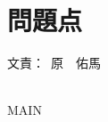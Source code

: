 \documentclass[a4paper]{jarticle}
\newcommand{\resp}[1]{\begin{flushright}文責：~#1\end{flushright}~\\}
\begin{document}
\fi

\section{問題点}
  \resp{原　佑馬}

\expandafter\ifx\csname MAIN \endcsname\relax
  
\end{document}
